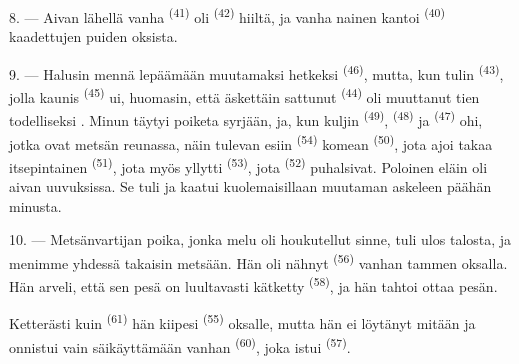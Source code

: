 8. --- Aivan lähellä vanha  \textsuperscript{(41)} oli
 \textsuperscript{(42)} hiiltä, ja vanha nainen
kantoi  \textsuperscript{(40)} 
kaadettujen puiden oksista.

\VUsaut{3.0mm}
\VUsaut{3.0mm}

9. --- Halusin mennä lepäämään muutamaksi hetkeksi 
\textsuperscript{(46)}, mutta, kun tulin 
\textsuperscript{(43)}, jolla kaunis  \textsuperscript{(45)} ui,
huomasin, että äskettäin sattunut  \textsuperscript{(44)} oli
muuttanut tien todelliseksi . Minun täytyi poiketa syrjään, ja,
kun kuljin  \textsuperscript{(49)}, 
\textsuperscript{(48)} ja  \textsuperscript{(47)} ohi, jotka ovat
metsän reunassa, näin tulevan esiin 
\textsuperscript{(54)} komean  \textsuperscript{(50)}, jota
ajoi takaa itsepintainen  \textsuperscript{(51)}, jota myös
yllytti  \textsuperscript{(53)}, jota  \textsuperscript{(52)} puhalsivat. Poloinen eläin oli aivan uuvuksissa.
Se tuli ja kaatui kuolemaisillaan muutaman askeleen päähän minusta.

10. --- Metsänvartijan poika, jonka  melu oli
houkutellut sinne, tuli ulos talosta, ja menimme yhdessä takaisin metsään. Hän
oli nähnyt  \textsuperscript{(56)} vanhan tammen oksalla. Hän
arveli, että sen pesä on luultavasti kätketty 
\textsuperscript{(58)}, ja hän tahtoi ottaa pesän.

Ketterästi kuin  \textsuperscript{(61)} hän kiipesi
 \textsuperscript{(55)} oksalle, mutta hän ei löytänyt mitään ja
onnistui vain säikäyttämään vanhan  \textsuperscript{(60)},
joka istui  \textsuperscript{(57)}.
\VUsaut{4.0mm}
\VUfilet{22mm}
